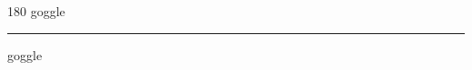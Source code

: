 
\begin{frame}
\begin{center}
\begin{turn}{180}
{\fontsize{2.5cm}{1em}\selectfont goggle}
\end{turn}
\vspace{1em}\par  
\hrule
\vspace{1em}\par  
{\fontsize{2.5cm}{1em}\selectfont goggle}
\end{center}
\end{frame}
